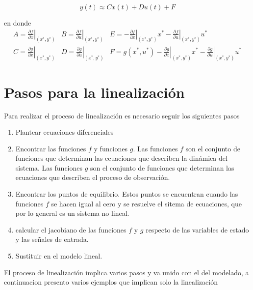 \documentclass[12pt]{book}
\theoremstyle{definition}
\theoremstyle{remark}
\theoremstyle{plain}
\begin{document}
\begin{equation}
\label{equ104}
y (t) \approx  C  x(t) +  D u(t)+ F
\end{equation}

en donde 
\begin{equation}
\label{equ105}
\begin{aligned}
A= \left . \frac{\partial f}{\partial x}  \right | _ {(x^*, y^*)}& B =  \left . \frac{\partial f}{\partial u}  \right |   _ {(x^*, y^*)} & E= - \left . \frac{\partial f}{\partial x}  \right | _ {(x^*, y^*)} x^*-\left . \frac{\partial f}{\partial u}  \right |   _ {(x^*, y^*)} u^*\\
C= \left . \frac{\partial g}{\partial x}  \right | _ {(x^*, y^*)}&  D =  \left . \frac{\partial g}{\partial u}  \right |   _ {(x^*, y^*)} & F=  g(x^*,u^*) -\left . \frac{\partial g}{\partial x}  \right | _ {(x^*, y^*)} x^*-\left . \frac{\partial g}{\partial u}  \right |   _ {(x^*, y^*)} u^*
\end{aligned}
\end{equation}

\section{Pasos para la linealización}

Para realizar el proceso de linealización es necesario seguir los siguientes pasos
\begin{enumerate}
\item Plantear ecuaciones diferenciales
\item Encontrar las funciones $f$ y funciones $g$. Las funciones $f$ son el conjunto de funciones que determinan las ecuaciones que describen la dinámica del sistema. Las funciones $g$ son el conjunto de funciones que determinan las ecuaciones que describen el proceso de observación.
\item Encontrar los puntos de equilibrio. Estos puntos se encuentran cuando las funciones $f$ se hacen igual al cero y se resuelve el sitema de ecuaciones, que por lo general es un sistema no lineal.
\item calcular el jacobiano de las funciones $f$ y $g$ respecto de las variables de estado y las señales de entrada.
\item Sustituir en el modelo lineal. 
\end{enumerate}

El proceso de linealización implica varios pasos y va unido con el del modelado, a continuacion presento varios ejemplos que implican solo la linealización
\end{document}

